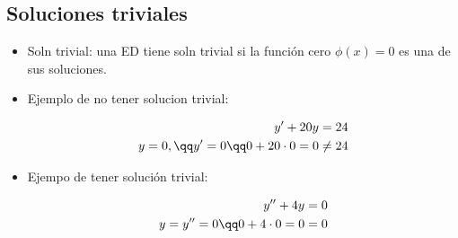 \subsection{Soluciones triviales}
\begin{itemize}
    \item Soln trivial: una ED tiene soln trivial si la función cero $\phi(x)=0$ es una de sus soluciones.
    \item Ejemplo de no tener solucion trivial:
        \begin{center}
           \begin{align*}
               y'+20y=24 \\ 
               y = 0, \qq y'=0 \qq 0+20\cdot 0 = 0 \neq 24 \\ 
           \end{align*}
        \end{center}
    
    \item Ejempo de tener solución trivial:
        \begin{center}
           \begin{align*}
               y''+4y=0 \\ 
               y = y'' = 0 \qq 0+4\cdot 0 = 0 = 0 \\ 
           \end{align*}
        \end{center}
\end{itemize}

